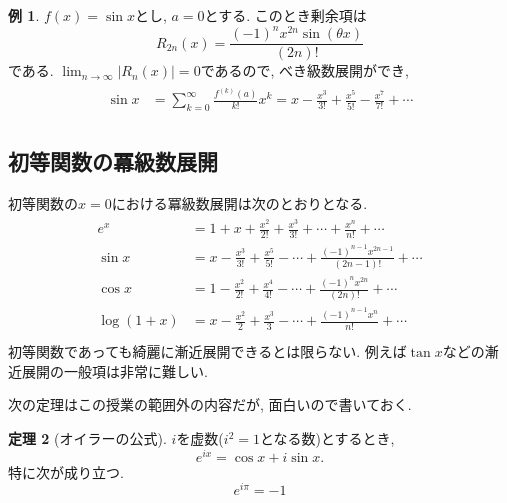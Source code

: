 \documentclass[dvipdfmx,a4paper,11pt]{article}
\theoremstyle{definition}
\newtheorem{thm}{定理}
\newtheorem{exa}[thm]{例}
\begin{document}
  \begin{exa}
 $f(x)=\sin x$とし, $a=0$とする. このとき剰余項は
 $$
 R_{2n}(x) = \frac{(-1)^{n}x^{2n} \sin ( \theta x) }{(2n)!}
 $$
 である. $\lim_{n \rightarrow \infty}|R_n(x)| =0$であるので, べき級数展開ができ, 
\begin{align*}
\begin{split}
\sin x&= \sum_{k=0}^{ \infty }\frac{f^{(k)}(a)}{k!}x^k = 
 x - \frac{x^3}{3!} + \frac{x^5}{5!} -  \frac{x^7}{7!} +  \cdots 
\end{split}
\end{align*}
 \end{exa}
 
 \subsection{初等関数の冪級数展開}

 初等関数の$x=0$における冪級数展開は次のとおりとなる. 
\begin{align*}
\begin{split}
e^x &= 1 + x+  \frac{x^2}{2!} + \frac{x^3}{3!}  + \cdots  + 
 \frac{ x^{n}}{n!} + \cdots \\
\sin x &= x - \frac{x^3}{3!} + \frac{x^5}{5!} - \cdots  + 
 \frac{(-1)^{n-1} x^{2n-1}}{(2n-1)!} 
 +\cdots \\
 \cos x &= 1 - \frac{x^2}{2!} + \frac{x^4}{4!} - \cdots  + 
 \frac{(-1)^{n} x^{2n}}{(2n)!} 
 + \cdots\\
 \log(1+x) &= x - \frac{x^2}{2} + \frac{x^3}{3}  - \cdots   
 + \frac{ (-1)^{n-1}x^{n}}{n!} + \cdots \\
\end{split}
\end{align*}
初等関数であっても綺麗に漸近展開できるとは限らない. 例えば$\tan x$などの漸近展開の一般項は非常に難しい.
 
次の定理はこの授業の範囲外の内容だが, 面白いので書いておく. 
\begin{tcolorbox}[
    colback = white,
    colframe = green!35!black,
    fonttitle = \bfseries,
    breakable = true]
    \begin{thm}[オイラーの公式]
$i$を虚数($i^2=1$となる数)とするとき, 
$$
e^{ix} = \cos x + i \sin x.
$$
特に次が成り立つ.
$$
e^{i \pi} =-1
$$
    \end{thm}
 \end{tcolorbox}
 
\end{document}
